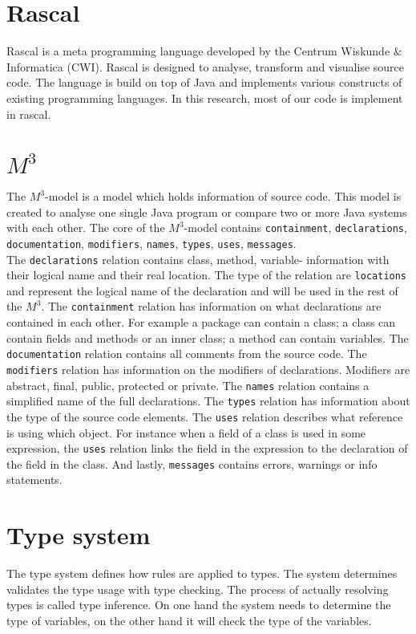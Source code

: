 \documentclass[../main.tex]{subfiles}
\begin{document}
    \section{Rascal}\label{sec:background_rascal}
    \Gls{Rascal} is a meta programming language developed by the Centrum Wiskunde \& Informatica (CWI)\cite{Kli:09}.
    Rascal is designed to analyse, transform and visualise source code.
    The language is build on top of Java and implements various constructs of existing programming languages.
    In this research, most of our code is implement in rascal.

    \section{$M^3$}\label{sec:background_m3}
    The $M^3$-model is a model which holds information of source code\cite{Ana:13}.
    This model is created to analyse one single Java program or compare two or more Java systems with each other.
    The core of the $M^3$-model contains \texttt{containment}, \texttt{declarations}, \texttt{documentation}, \texttt{modifiers}, \texttt{names}, \texttt{types}, \texttt{uses}, \texttt{messages}.
    \\
    The \texttt{declarations} relation contains class, method, variable- information with their logical name and their real location. The type of the relation are \texttt{locations} and represent the logical name of the declaration and will be used in the rest of the $M^3$.
    The \texttt{containment} relation has information on what declarations are contained in each other. For example a package can contain a class; a class can contain fields and methods or an inner class; a method can contain variables.    
    The \texttt{documentation} relation contains all comments from the source code. 
    The \texttt{modifiers} relation has information on the modifiers of declarations. Modifiers are abstract, final, public, protected or private.
    The \texttt{names} relation contains a simplified name of the full declarations.
    The \texttt{types} relation has information about the type of the source code elements.
    The \texttt{uses} relation describes what reference is using which object. For instance when a field of a class is used in some expression, the \texttt{uses} relation links the field in the expression to the declaration of the field in the class.
    And lastly, \texttt{messages} contains errors, warnings or info statements.
    
    \section{Type system}\label{sec:background_type-system}
    The type system defines how rules are applied to types.
    The system determines validates the type usage with type checking.
    The process of actually resolving types is called type inference.
    On one hand the system needs to determine the type of variables, on the other hand it will check the type of the variables.
\end{document}
